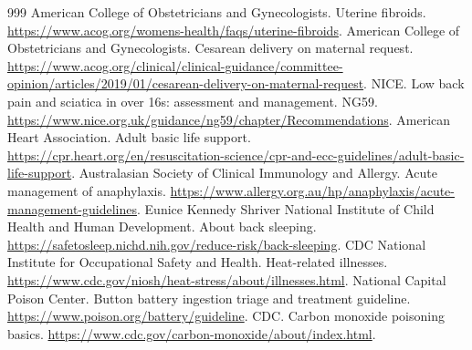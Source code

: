 \documentclass[11pt,oneside]{book}
\begin{document}
\begin{thebibliography}{999}
American College of Obstetricians and Gynecologists. Uterine fibroids. \url{https://www.acog.org/womens-health/faqs/uterine-fibroids}.
American College of Obstetricians and Gynecologists. Cesarean delivery on maternal request. \url{https://www.acog.org/clinical/clinical-guidance/committee-opinion/articles/2019/01/cesarean-delivery-on-maternal-request}.
NICE. Low back pain and sciatica in over 16s: assessment and management. NG59. \url{https://www.nice.org.uk/guidance/ng59/chapter/Recommendations}.
American Heart Association. Adult basic life support. \url{https://cpr.heart.org/en/resuscitation-science/cpr-and-ecc-guidelines/adult-basic-life-support}.
Australasian Society of Clinical Immunology and Allergy. Acute management of anaphylaxis. \url{https://www.allergy.org.au/hp/anaphylaxis/acute-management-guidelines}.
Eunice Kennedy Shriver National Institute of Child Health and Human Development. About back sleeping. \url{https://safetosleep.nichd.nih.gov/reduce-risk/back-sleeping}.
CDC National Institute for Occupational Safety and Health. Heat-related illnesses. \url{https://www.cdc.gov/niosh/heat-stress/about/illnesses.html}.
National Capital Poison Center. Button battery ingestion triage and treatment guideline. \url{https://www.poison.org/battery/guideline}.
CDC. Carbon monoxide poisoning basics. \url{https://www.cdc.gov/carbon-monoxide/about/index.html}.
\end{thebibliography}
\endgroup
\end{document}

